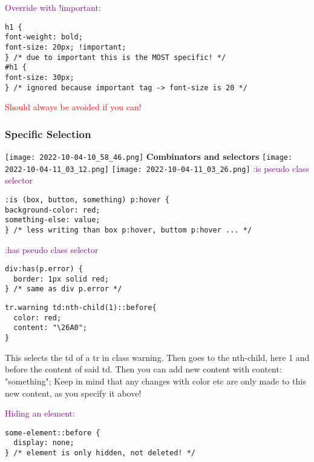 \documentclass[main.tex,fontsize=6pt,paper=a4,paper=landscape,DIV=calc,]{scrartcl}
\begin{document}
\begin{multicols*}{4}
\textcolor{purple}{Override with !important:}
\vspace{-2mm}
\begin{lstlisting}
h1 {
font-weight: bold;
font-size: 20px; !important;
} /* due to important this is the MOST specific! */
#h1 {
font-size: 30px;
} /* ignored because important tag -> font-size is 20 */
\end{lstlisting}
\vspace{2mm}
\textcolor{red}{Should always be avoided if you can!}

\subsubsection{Specific Selection}
\texttt{[image: 2022-10-04-10\_58\_46.png]}
\textbf{Combinators and selectors}  
\texttt{[image: 2022-10-04-11\_03\_12.png]}\newline 
\texttt{[image: 2022-10-04-11\_03\_26.png]}\newline
\textcolor{purple}{:is pseudo class selector}
\vspace{-2mm}
\begin{lstlisting}
:is (box, button, something) p:hover {
background-color: red;
something-else: value;
} /* less writing than box p:hover, buttom p:hover ... */
\end{lstlisting}
\vspace{2mm}
\textcolor{purple}{:has pseudo class selector}
\vspace{-2mm}
\begin{lstlisting}
div:has(p.error) {
  border: 1px solid red;
} /* same as div p.error */
\end{lstlisting}
\vspace{2mm}
\vspace{-2mm}
\begin{lstlisting}
tr.warning td:nth-child(1)::before{
  color: red;
  content: "\26A0";
}
\end{lstlisting}
\vspace{2mm}
 This selects the td of a tr in class warning. Then goes to the nth-child, here 1 and before the content of said td.\newline
Then you can add new content with content: "something";\newline
Keep in mind that any changes with color etc are only made to this new content, as you specify it above!\newline

\textcolor{purple}{Hiding an element:}
\vspace{-2mm}
\begin{lstlisting}
some-element::before {
  display: none;
} /* element is only hidden, not deleted! */
\end{lstlisting}
\vspace{2mm}


\end{multicols*}
\end{document}
